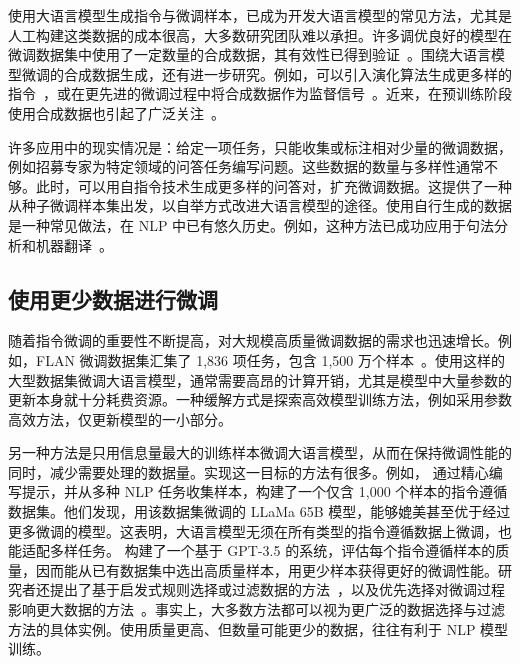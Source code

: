 使用大语言模型生成指令与微调样本，已成为开发大语言模型的常见方法，尤其是人工构建这类数据的成本很高，大多数研究团队难以承担。许多调优良好的模型在微调数据集中使用了一定数量的合成数据，其有效性已得到验证~\cite{ouyang-etal:2022training,taori-etal:2023alpaca,chiang-etal:2023vicuna}。围绕大语言模型微调的合成数据生成，还有进一步研究。例如，可以引入演化算法生成更多样的指令~\cite{xu-etal:2024wizardlm}，或在更先进的微调过程中将合成数据作为监督信号~\cite{chen-etal:2024self}。近来，在预训练阶段使用合成数据也引起了广泛关注~\cite{gunasekar-etal:2023textbooks,allal-etal:2024cosmopedia}。

许多应用中的现实情况是：给定一项任务，只能收集或标注相对少量的微调数据，例如招募专家为特定领域的问答任务编写问题。这些数据的数量与多样性通常不够。此时，可以用自指令技术生成更多样的问答对，扩充微调数据。这提供了一种从种子微调样本集出发，以自举方式改进大语言模型的途径。使用自行生成的数据是一种常见做法，在 NLP 中已有悠久历史。例如，这种方法已成功应用于句法分析和机器翻译~\cite{charniak:1997statistical,sennrich-etal:2016improving}。

\subsection{使用更少数据进行微调}

\noindent 随着指令微调的重要性不断提高，对大规模高质量微调数据的需求也迅速增长。例如，FLAN 微调数据集汇集了 1,836 项任务，包含 1,500 万个样本~\cite{longpre-etal:2023flan}。使用这样的大型数据集微调大语言模型，通常需要高昂的计算开销，尤其是模型中大量参数的更新本身就十分耗费资源。一种缓解方式是探索高效模型训练方法，例如采用参数高效方法，仅更新模型的一小部分。

另一种方法是只用信息量最大的训练样本微调大语言模型，从而在保持微调性能的同时，减少需要处理的数据量。实现这一目标的方法有很多。例如，\citet{zhou-etal:2023lima} 通过精心编写提示，并从多种 NLP 任务收集样本，构建了一个仅含 1,000 个样本的指令遵循数据集。他们发现，用该数据集微调的 LLaMa 65B 模型，能够媲美甚至优于经过更多微调的模型。这表明，大语言模型无须在所有类型的指令遵循数据上微调，也能适配多样任务。\citet{chen-etal:2024alpagasus} 构建了一个基于 GPT-3.5 的系统，评估每个指令遵循样本的质量，因而能从已有数据集中选出高质量样本，用更少样本获得更好的微调性能。研究者还提出了基于启发式规则选择或过滤数据的方法~\cite{zhao-etal:2024long,ge-etal:2024clustering}，以及优先选择对微调过程影响更大数据的方法~\cite{xia-etal:2024less}。事实上，大多数方法都可以视为更广泛的数据选择与过滤方法的具体实例。使用质量更高、但数量可能更少的数据，往往有利于 NLP 模型训练。

